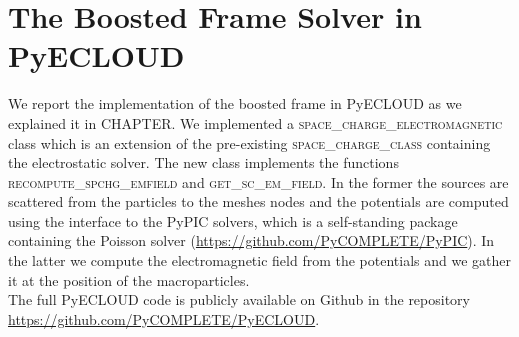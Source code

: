 \chapter{The Boosted Frame Solver in PyECLOUD}
\label{ch:BoostedFrameCode}
We report the implementation of the boosted frame in PyECLOUD as we explained it in CHAPTER. We implemented a \textsc{space\_charge\_electromagnetic} class which is an extension of the pre-existing \textsc{space\_charge\_class} containing the electrostatic solver. The new class implements the functions \textsc{recompute\_spchg\_emfield} and \textsc{get\_sc\_em\_field}. In the former the sources are scattered from the particles to the meshes nodes and the potentials are computed using the interface to the PyPIC solvers, which is a self-standing package containing the Poisson solver (\href{https://github.com/PyCOMPLETE/PyPIC}{https://github.com/PyCOMPLETE/PyPIC}). In the latter we compute the electromagnetic field from the potentials and we gather it at the position of the macroparticles.\\
The full PyECLOUD code is publicly available on Github in the repository \href{https://github.com/PyCOMPLETE/PyECLOUD}{https://github.com/PyCOMPLETE/PyECLOUD}.

